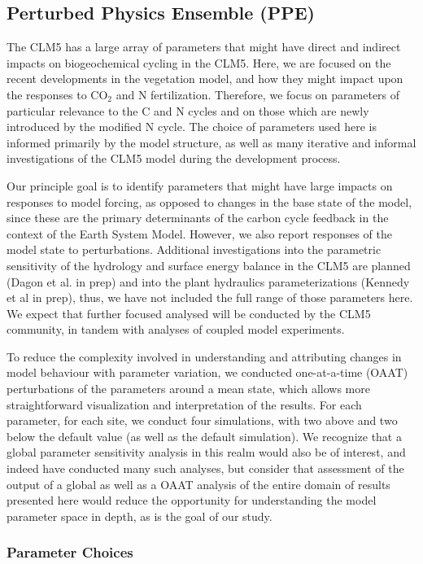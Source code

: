 \documentclass[draft,linenumbers]{agujournal}
\begin{document}
\subsection{Perturbed Physics Ensemble (PPE)}
The CLM5 has a large array of parameters that might have direct and indirect impacts on biogeochemical cycling in the CLM5. Here, we are focused on the recent developments in the vegetation model, and how they might impact upon the responses to CO$_{2}$ and N fertilization. Therefore, 
we focus on parameters of particular relevance to the C and N cycles and on those which are newly introduced by the modified N cycle. The choice of parameters used here is informed primarily by the model structure, as well as many iterative and informal investigations of the CLM5 model during the development process. 

Our principle goal is to identify parameters that might have large impacts on responses to model forcing, as opposed to changes in the base state of the model, since these are the primary determinants of the carbon cycle feedback in the context of the Earth System Model. However, we also report responses of the model state to perturbations. Additional investigations into the parametric sensitivity of the hydrology and surface energy balance in the CLM5 are planned (Dagon et al. in prep) and into the plant hydraulics parameterizations (Kennedy et al in prep), thus, we have not included the full range of those parameters here. We expect that further focused analysed will be conducted by the CLM5 community, in tandem with analyses of coupled model experiments. 

To reduce the complexity involved in understanding and attributing changes in model behaviour with parameter variation, we conducted one-at-a-time (OAAT) perturbations of the parameters around a mean state, which allows more straightforward visualization and interpretation of the results. For each parameter, for each site, we conduct four simulations, with two above and two below the default value (as well as the default simulation). We recognize that a global parameter sensitivity analysis in this realm would also be of interest, and indeed have conducted many such analyses, but consider that assessment of the output of a global as well as a OAAT analysis of the entire domain of results presented here would reduce the opportunity for understanding the model parameter space in depth, as is the goal of our study. 

\subsubsection{Parameter Choices}
\end{document}
